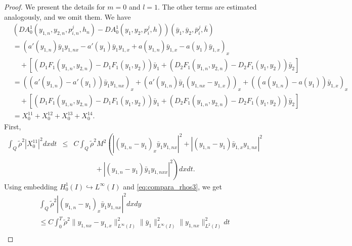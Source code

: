 \documentclass[10pt,a4paper]{amsart}
\begin{document}
\begin{proof}
    We present the details for $m=0$ and $l=1$. The other terms are estimated analogously, and we omit them. We have
    \begin{equation*}
        \begin{split}
    	   &(D A^1_0(y_{1,n},y_{2,n},p^{j}_{i,n},h_{n})-D A^1_0( y_1, y_2, p_i^j, h))(\bar y_1,\bar y_2,\bar p_i^j,\bar h)\\
           &= \left(a'(y_{1,n})\bar y_{1} y_{1,nx} - a'(y_{1})\bar y_{1} y_{1,x} + a(y_{1,n}) \bar y_{1,x} - a(y_1) \bar y_{1,x} \right)_x \\
           &\quad + [ (D_1 F_1(y_{1,n},y_{2,n})-D_1 F_1(y_1,y_2))\bar y_1 + (D_2 F_1(y_{1,n},y_{2,n})-D_2 F_1(y_1,y_2))\bar y_2] \\
           &= ((a'(y_{1,n})-a'(y_{1}))\bar y_{1} y_{1,nx})_x + (a'(y_{1,n})\bar y_{1} (y_{1,nx}-y_{1,x}))_x + ((a(y_{1,n})-a(y_{1})) \bar y_{1,x})_x \\&\quad + [ (D_1 F_1(y_{1,n},y_{2,n})-D_1 F_1(y_1,y_2))\bar y_1 + (D_2 F_1(y_{1,n},y_{2,n})-D_2 F_1(y_1,y_2))\bar y_2] \\
           &= X_0^{11}+X_0^{12}+X_0^{13}+X_0^{14}.
        \end{split}
    \end{equation*}First, 
    \begin{eqnarray*}
        \int_{Q} \tilde\rho^{2}|X_{0}^{11}|^{2} dxdt
    	&\leq&C\int_{Q} \tilde\rho^{2} M^2 \left( \left|(y_{1,n}-y_1)_x \bar y_1 y_{1,nx} \right|^2 + \left|(y_{1,n}-y_1) \bar y_{1,x} y_{1,nx}  \right|^2 \right. \\
        &&\left. \qquad\quad +\left|(y_{1,n}-y_1) \bar y_1 y_{1,nxx} \right|^2 \right) dxdt.
    \end{eqnarray*}
    Using embedding $H^1_0(I) \hookrightarrow L^\infty(I)$ and %
    \eqref{eq:compara_rhos3}, we get
    \begin{equation*}
        \begin{split}
            &\int_{Q} \tilde\rho^{2} \left|(y_{1,n}-y_1)_x \bar y_1 y_{1,nx} \right|^2 dx dy \\
            &\leq C\int_0^T \tilde\rho^{2} \|y_{1,nx}-y_{1,x}\|_{L^\infty(I)}^2 \|\bar y_1\|_{L^\infty(I)}^2 \|y_{1,nx}\|_{L^2(I)}^2 dt \\

\end{split}
\end{equation*}
\end{proof}
\end{document}
